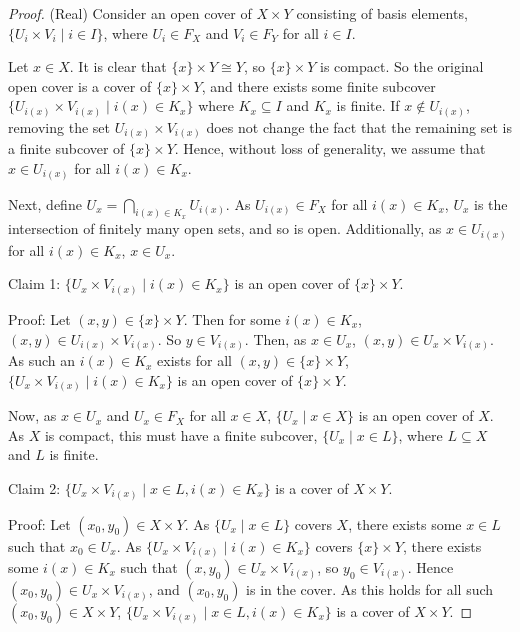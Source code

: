 \begin{proof}
	{(Real)} Consider an open cover of $X \times Y$ consisting of basis elements, $\{U_i \times V_i \mid i \in I\}$, where $U_i \in F_X$ and $V_i \in F_Y$ for all $i \in I$.
	
	Let $x \in X$. It is clear that $\{x\} \times Y \cong Y$, so $\{x\} \times Y$ is compact. So the original open cover is a cover of $\{x\} \times Y$, and there exists some finite subcover $\{U_{i(x)} \times V_{i(x)} \mid i(x) \in K_x\}$ where $K_x \subseteq I$ and $K_x$ is finite. If $x \notin U_{i(x)}$, removing the set $U_{i(x)} \times V_{i(x)}$ does not change the fact that the remaining set is a finite subcover of $\{x\} \times Y$. Hence, without loss of generality, we assume that $x \in U_{i(x)}$ for all $i(x) \in K_x$.
	
	Next, define $\displaystyle{U_x = \bigcap_{i(x) \in K_x} U_{i(x)}}$. As $U_{i(x)} \in F_X$ for all $i(x) \in K_x$, $U_x$ is the intersection of finitely many open sets, and so is open. Additionally, as $x \in U_{i(x)}$ for all $i(x) \in K_x$, $x \in U_x$.
	
	Claim 1: $\{U_x \times V_{i(x)} \mid i(x) \in K_x\}$ is an open cover of $\{x\} \times Y$.
	
	Proof: Let $(x,y) \in \{x\} \times Y$. Then for some $i(x) \in K_x$, $(x,y) \in U_{i(x)} \times V_{i(x)}$. So $y \in V_{i(x)}$. Then, as $x \in U_x$, $(x,y) \in U_x \times V_{i(x)}$. As such an $i(x) \in K_x$ exists for all $(x,y) \in \{x\} \times Y$, $\{U_x \times V_{i(x)} \mid i(x) \in K_x\}$ is an open cover of $\{x\} \times Y$.
	
	Now, as $x \in U_x$ and $U_x \in F_X$ for all $x \in X$, $\{U_x \mid x \in X\}$ is an open cover of $X$. As $X$ is compact, this must have a finite subcover, $\{U_x \mid x \in L\}$, where $L \subseteq X$ and $L$ is finite.
	
	Claim 2: $\{U_x \times V_{i(x)} \mid x \in L, i(x) \in K_x\}$ is a cover of $X \times Y$.
	
	Proof: Let $(x_0,y_0) \in X \times Y$. As $\{U_x \mid x \in L\}$ covers $X$, there exists some $x \in L$ such that $x_0 \in U_x$. As $\{U_x \times V_{i(x)} \mid i(x) \in K_x\}$ covers $\{x\} \times Y$, there exists some $i(x) \in K_x$ such that $(x,y_0) \in U_x \times V_{i(x)}$, so $y_0 \in V_{i(x)}$. Hence $(x_0, y_0) \in U_x \times V_{i(x)}$, and $(x_0,y_0)$ is in the cover. As this holds for all such $(x_0,y_0) \in X \times Y$, $\{U_x \times V_{i(x)} \mid x \in L, i(x) \in K_x\}$ is a cover of $X \times Y$.
	

\end{proof}
